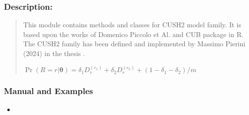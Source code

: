 \documentclass[letterpaper,10pt,english]{sphinxmanual}
\begin{document}
\subsubsection{Description:}
\label{\detokenize{cubmods:id462}}\begin{quote}

\sphinxAtStartPar
This module contains methods and classes
for CUSH2 model family.
It is based upon the works of Domenico
Piccolo et Al. and CUB package in R.
The CUSH2 family has been defined and implemented
by Massimo Pierini (2024) in the thesis
.

\sphinxAtStartPar
\(\Pr(R=r|\pmb \theta) = \delta_1 D_r^{(c_1)} + \delta_2 D_r^{(c_2)} + (1 - \delta_1 - \delta_2)/m\)
\end{quote}


\subsubsection{Manual and Examples}
\label{\detokenize{cubmods:id463}}\begin{itemize}
\item {} 
\sphinxAtStartPar
{}

\end{itemize}
\end{document}
